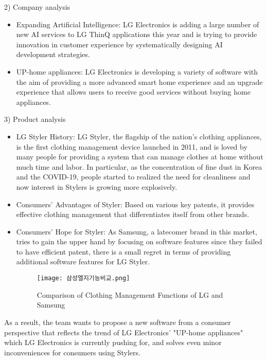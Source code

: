 \documentclass[conference]{IEEEtran}
\begin{document}
2) Company analysis
\begin{itemize}
    \item Expanding Artificial Intelligence: LG Electronics is adding a large number of new AI services to LG ThinQ applications this year and is trying to provide innovation in customer experience by systematically designing AI development strategies.\\
    \item UP-home appliances: LG Electronics is developing a variety of software with the aim of providing a more advanced smart home experience and an upgrade experience that allows users to receive good services without buying home appliances.\\
\end{itemize}

3) Product analysis
\begin{itemize}
    \item LG Styler History: LG Styler, the flagship of the nation's clothing appliances, is the first clothing management device launched in 2011, and is loved by many people for providing a system that can manage clothes at home without much time and labor. In particular, as the concentration of fine dust in Korea and the COVID-19, people started to realized the need for cleanliness and now interest in Stylers is growing more explosively.\\
    \item Consumers' Advantages of Styler: Based on various key patents, it provides effective clothing management that differentiates itself from other brands.\\
    \item Consumers' Hope for Styler: As Samsung, a latecomer brand in this market, tries to gain the upper hand by focusing on software features since they failed to have efficient patent, there is a small regret in terms of providing additional software features for LG Styler.
    \begin{figure}[htbp]
        \centerline{\texttt{[image: 삼성엘지기능비교.png]}}
        \caption{Comparison of Clothing Management Functions of LG and Samsung}
        \label{fig}
    \end{figure}
    
\end{itemize}
As a result, the team wants to propose a new software from a consumer perspective that reflects the trend of LG Electronics' "UP-home appliances" which LG Electronics is currently pushing for, and solves even minor inconveniences for consumers using Stylers.\\
\end{document}
